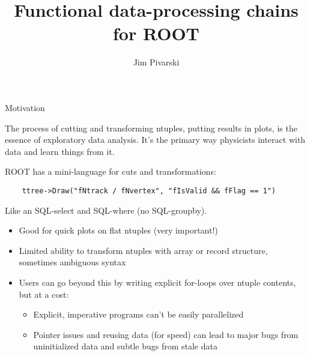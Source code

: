 \documentclass{beamer}
\title{Functional data-processing chains for ROOT}
\author{Jim Pivarski}
\begin{document}
\begin{frame}
  \titlepage
\end{frame}

\begin{frame}[fragile]{Motivation}

\begin{block}{}
The process of cutting and transforming ntuples, putting results in plots, is the essence of exploratory data analysis. It's the primary way physicists interact with data and learn things from it.
\end{block}

\begin{block}{}
ROOT has a mini-language for cuts and transformations:
{\scriptsize \begin{verbatim}
    ttree->Draw("fNtrack / fNvertex", "fIsValid && fFlag == 1")
\end{verbatim}}
Like an SQL-select and SQL-where (no SQL-groupby).
\end{block}

\begin{itemize}
\item Good for quick plots on flat ntuples (very important!)
\item Limited ability to transform ntuples with array or record structure, sometimes ambiguous syntax
\item Users can go beyond this by writing explicit for-loops over ntuple contents, but at a cost:
\begin{itemize}
\item Explicit, imperative programs can't be easily parallelized
\item Pointer issues and reusing data (for speed) can lead to major bugs from uninitialized data and subtle bugs from stale data
\end{itemize}
\end{itemize}
\end{frame}
\end{document}
